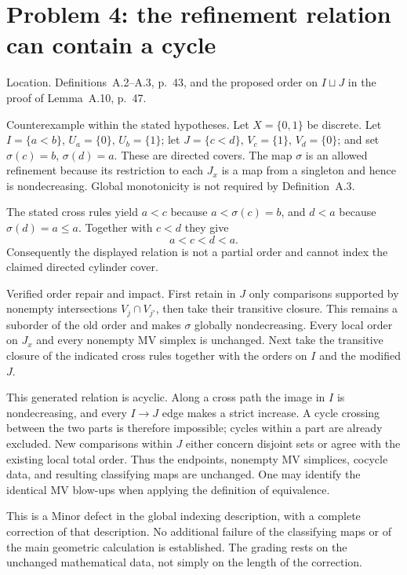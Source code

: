 \documentclass[10pt]{article}
\begin{document}
\section*{Problem 4: the refinement relation can contain a cycle}
Location. Definitions A.2–A.3, p. 43, and the proposed order on \(I\sqcup J\) in the proof of Lemma A.10, p. 47.\par
Counterexample within the stated hypotheses. Let \(X=\{0,1\}\) be discrete. Let \(I=\{a<b\}\), \(U_a=\{0\}\), \(U_b=\{1\}\); let \(J=\{c<d\}\), \(V_c=\{1\}\), \(V_d=\{0\}\); and set \(\sigma(c)=b\), \(\sigma(d)=a\). These are directed covers. The map \(\sigma\) is an allowed refinement because its restriction to each \(J_x\) is a map from a singleton and hence is nondecreasing. Global monotonicity is not required by Definition A.3.\par
The stated cross rules yield \(a<c\) because \(a<\sigma(c)=b\), and \(d<a\) because \(\sigma(d)=a\le a\). Together with \(c<d\) they give \[a<c<d<a .\] Consequently the displayed relation is not a partial order and cannot index the claimed directed cylinder cover.\par
Verified order repair and impact. First retain in \(J\) only comparisons supported by nonempty intersections \(V_j\cap V_{j'}\), then take their transitive closure. This remains a suborder of the old order and makes \(\sigma\) globally nondecreasing. Every local order on \(J_x\) and every nonempty MV simplex is unchanged. Next take the transitive closure of the indicated cross rules together with the orders on \(I\) and the modified \(J\).\par
This generated relation is acyclic. Along a cross path the image in \(I\) is nondecreasing, and every \(I\to J\) edge makes a strict increase. A cycle crossing between the two parts is therefore impossible; cycles within a part are already excluded. New comparisons within \(J\) either concern disjoint sets or agree with the existing local total order. Thus the endpoints, nonempty MV simplices, cocycle data, and resulting classifying maps are unchanged. One may identify the identical MV blow-ups when applying the definition of equivalence.\par
This is a Minor defect in the global indexing description, with a complete correction of that description. No additional failure of the classifying maps or of the main geometric calculation is established. The grading rests on the unchanged mathematical data, not simply on the length of the correction.\par
\end{document}
